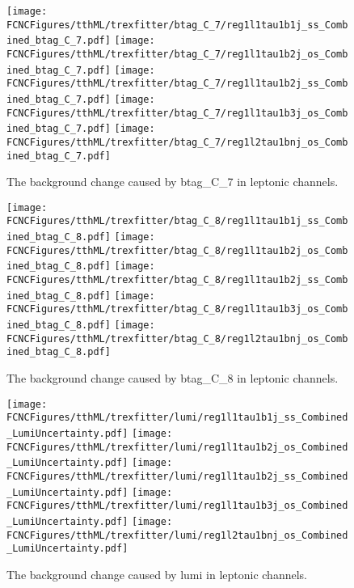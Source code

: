 \begin{figure}[H]
\centering
\texttt{[image: \\FCNCFigures/tthML/trexfitter/btag\_C\_7/reg1l1tau1b1j\_ss\_Combined\_btag\_C\_7.pdf]}
\texttt{[image: \\FCNCFigures/tthML/trexfitter/btag\_C\_7/reg1l1tau1b2j\_os\_Combined\_btag\_C\_7.pdf]}
\texttt{[image: \\FCNCFigures/tthML/trexfitter/btag\_C\_7/reg1l1tau1b2j\_ss\_Combined\_btag\_C\_7.pdf]}
\texttt{[image: \\FCNCFigures/tthML/trexfitter/btag\_C\_7/reg1l1tau1b3j\_os\_Combined\_btag\_C\_7.pdf]}
\texttt{[image: \\FCNCFigures/tthML/trexfitter/btag\_C\_7/reg1l2tau1bnj\_os\_Combined\_btag\_C\_7.pdf]}
\caption{The background change caused by btag\_C\_7 in leptonic channels.}
\label{fig:tthML_btag_C_7}
\end{figure}

\begin{figure}[H]
\centering
\texttt{[image: \\FCNCFigures/tthML/trexfitter/btag\_C\_8/reg1l1tau1b1j\_ss\_Combined\_btag\_C\_8.pdf]}
\texttt{[image: \\FCNCFigures/tthML/trexfitter/btag\_C\_8/reg1l1tau1b2j\_os\_Combined\_btag\_C\_8.pdf]}
\texttt{[image: \\FCNCFigures/tthML/trexfitter/btag\_C\_8/reg1l1tau1b2j\_ss\_Combined\_btag\_C\_8.pdf]}
\texttt{[image: \\FCNCFigures/tthML/trexfitter/btag\_C\_8/reg1l1tau1b3j\_os\_Combined\_btag\_C\_8.pdf]}
\texttt{[image: \\FCNCFigures/tthML/trexfitter/btag\_C\_8/reg1l2tau1bnj\_os\_Combined\_btag\_C\_8.pdf]}
\caption{The background change caused by btag\_C\_8 in leptonic channels.}
\label{fig:tthML_btag_C_8}
\end{figure}


\begin{figure}[H]
\centering
\texttt{[image: \\FCNCFigures/tthML/trexfitter/lumi/reg1l1tau1b1j\_ss\_Combined\_LumiUncertainty.pdf]}
\texttt{[image: \\FCNCFigures/tthML/trexfitter/lumi/reg1l1tau1b2j\_os\_Combined\_LumiUncertainty.pdf]}
\texttt{[image: \\FCNCFigures/tthML/trexfitter/lumi/reg1l1tau1b2j\_ss\_Combined\_LumiUncertainty.pdf]}
\texttt{[image: \\FCNCFigures/tthML/trexfitter/lumi/reg1l1tau1b3j\_os\_Combined\_LumiUncertainty.pdf]}
\texttt{[image: \\FCNCFigures/tthML/trexfitter/lumi/reg1l2tau1bnj\_os\_Combined\_LumiUncertainty.pdf]}
\caption{The background change caused by lumi in leptonic channels.}
\label{fig:tthML_lumi}
\end{figure}

